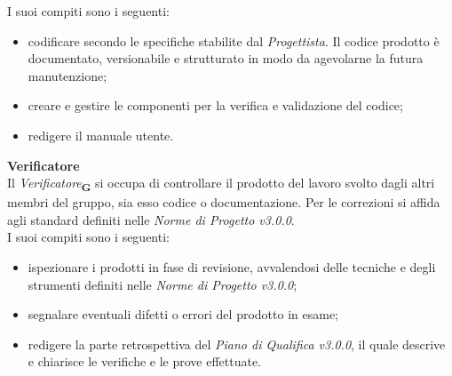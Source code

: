 I suoi compiti sono i seguenti:
\begin{itemize}
    \item codificare secondo le specifiche stabilite dal \textit{Progettista}. Il codice prodotto è documentato, versionabile e strutturato in modo da agevolarne la futura manutenzione;
    \item creare e gestire le componenti per la verifica e validazione del codice;
    \item redigere il manuale utente.
\end{itemize}
\textbf{Verificatore}\\
Il \textit{Verificatore}\textsubscript{\textbf{G}} si occupa di controllare il prodotto del lavoro svolto dagli altri membri del gruppo, sia esso codice o documentazione. Per le correzioni si affida agli standard definiti nelle \textit{Norme di Progetto v3.0.0}.\\
I suoi compiti sono i seguenti:
\begin{itemize}
    \item ispezionare i prodotti in fase di revisione, avvalendosi delle tecniche e degli strumenti definiti nelle \textit{Norme di Progetto v3.0.0};
    \item segnalare eventuali difetti o errori del prodotto in esame;
    \item redigere la parte retrospettiva del \textit{Piano di Qualifica v3.0.0}, il quale descrive e chiarisce le verifiche e le prove effettuate.
\end{itemize}

